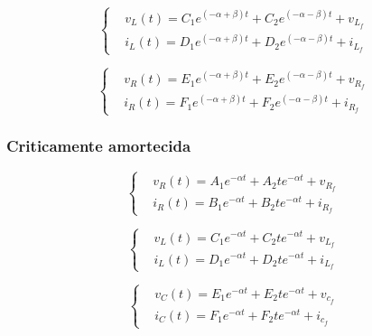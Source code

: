 \documentclass[12pt,fleqn]{book} %
\begin{document}
{\begin{equation}
\left\{\begin{aligned} & 
        v_L(t) = C_1e^{(-\alpha + \beta)t} + C_2e^{(-\alpha - \beta)t} + v_{L_f}\\&       
        i_L(t) = D_1e^{(-\alpha + \beta)t} + D_2e^{(-\alpha - \beta)t} + i_{L_f}
    \end{aligned}\right.
\end{equation}

\begin{equation}
\left\{\begin{aligned} & 
        v_R(t) = E_1e^{(-\alpha + \beta)t} + E_2e^{(-\alpha - \beta)t} + v_{R_f}\\&       
        i_R(t) = F_1e^{(-\alpha + \beta)t} + F_2e^{(-\alpha - \beta)t} + i_{R_f}
    \end{aligned}\right.
\end{equation}
            
            \subsubsection{Criticamente amortecida}

\begin{equation}
\left\{\begin{aligned} & 
        v_R(t) = A_1e^{-\alpha t} + A_2te^{-\alpha t} + v_{R_f}\\&       
        i_R(t) = B_1e^{-\alpha t} + B_2te^{-\alpha t} + i_{R_f}
    \end{aligned}\right.
\end{equation}  

\begin{equation}
\left\{\begin{aligned} & 
        v_L(t) = C_1e^{-\alpha t} + C_2te^{-\alpha t} + v_{L_f}\\&       
        i_L(t) = D_1e^{-\alpha t} + D_2te^{-\alpha t} + i_{L_f}
    \end{aligned}\right.
\end{equation}

\begin{equation}
\left\{\begin{aligned} & 
        v_C(t) = E_1e^{-\alpha t} + E_2te^{-\alpha t} + v_{c_f}\\&       
        i_C(t) = F_1e^{-\alpha t} + F_2te^{-\alpha t} + i_{c_f}
    \end{aligned}\right.
\end{equation}          
            
}
\end{document}
